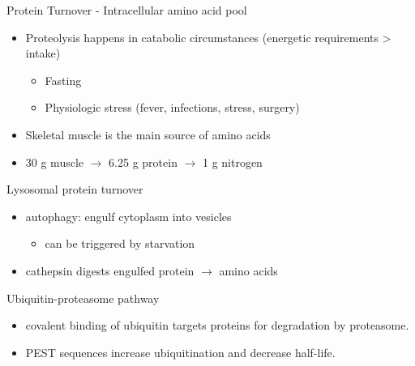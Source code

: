 \documentclass[presentation, smaller]{beamer}
\begin{document}
\begin{frame}[label={sec:orgheadline8}]{Protein Turnover - Intracellular amino acid pool}
\begin{itemize}
\item Proteolysis happens in catabolic circumstances (energetic requirements > intake)
\begin{itemize}
\item Fasting
\item Physiologic stress (fever, infections, stress, surgery)
\end{itemize}
\item Skeletal muscle is the main source of amino acids
\item 30 g muscle \(\to\) 6.25 g protein  \(\to\) 1 g nitrogen
\end{itemize}
\begin{block}{Lysosomal protein turnover}
\begin{itemize}
\item autophagy: engulf cytoplasm into vesicles
\begin{itemize}
\item can be triggered by starvation
\end{itemize}
\item cathepsin digests engulfed protein \(\to\) amino acids
\end{itemize}
\end{block}
\begin{block}{Ubiquitin-proteasome pathway}
\begin{itemize}
\item covalent binding of ubiquitin targets proteins for degradation by proteasome.
\item PEST sequences increase ubiquitination and decrease half-life.
\end{itemize}
\end{block}
\end{frame}
\end{document}
